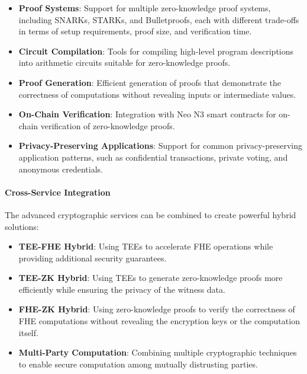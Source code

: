 \begin{itemize}
    \item \textbf{Proof Systems}: Support for multiple zero-knowledge proof systems, including SNARKs, STARKs, and Bulletproofs, each with different trade-offs in terms of setup requirements, proof size, and verification time.
    
    \item \textbf{Circuit Compilation}: Tools for compiling high-level program descriptions into arithmetic circuits suitable for zero-knowledge proofs.
    
    \item \textbf{Proof Generation}: Efficient generation of proofs that demonstrate the correctness of computations without revealing inputs or intermediate values.
    
    \item \textbf{On-Chain Verification}: Integration with Neo N3 smart contracts for on-chain verification of zero-knowledge proofs.
    
    \item \textbf{Privacy-Preserving Applications}: Support for common privacy-preserving application patterns, such as confidential transactions, private voting, and anonymous credentials.
\end{itemize}

\paragraph{Cross-Service Integration}
The advanced cryptographic services can be combined to create powerful hybrid solutions:

\begin{itemize}
    \item \textbf{TEE-FHE Hybrid}: Using TEEs to accelerate FHE operations while providing additional security guarantees.
    
    \item \textbf{TEE-ZK Hybrid}: Using TEEs to generate zero-knowledge proofs more efficiently while ensuring the privacy of the witness data.
    
    \item \textbf{FHE-ZK Hybrid}: Using zero-knowledge proofs to verify the correctness of FHE computations without revealing the encryption keys or the computation itself.
    
    \item \textbf{Multi-Party Computation}: Combining multiple cryptographic techniques to enable secure computation among mutually distrusting parties.
\end{itemize}

